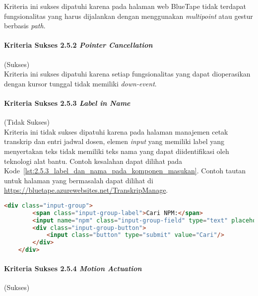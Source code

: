 Kriteria ini sukses dipatuhi karena pada halaman web BlueTape tidak terdapat fungsionalitas yang harus dijalankan dengan menggunakan \textit{multipoint} atau gestur berbasis \textit{path}.

\paragraph{Kriteria Sukses 2.5.2 \textit{Pointer Cancellation}}
\label{par:kepatuhan_bluetape_kriteria_sukses_2.5.2}
(Sukses)\\

Kriteria ini sukses dipatuhi karena setiap fungsionalitas yang dapat dioperasikan dengan kursor tunggal tidak memiliki \textit{down-event}.

\paragraph{Kriteria Sukses 2.5.3 \textit{Label in Name}}
\label{par:kepatuhan_bluetape_kriteria_sukses_2.5.3}
(Tidak Sukses)\\

Kriteria ini tidak sukses dipatuhi karena pada halaman manajemen cetak transkrip dan entri jadwal dosen, elemen \textit{input} yang memiliki label yang menyertakan teks tidak memiliki teks nama yang dapat diidentifikasi oleh teknologi alat bantu. Contoh kesalahan dapat dilihat pada \mbox{Kode \ref{lst:2.5.3_label_dan_nama_pada_komponen_masukan}}. Contoh tautan untuk halaman yang bermasalah dapat dilihat di \url{https://bluetape.azurewebsites.net/TranskripManage}.

\begin{lstlisting}[frame=single, label={lst:2.5.3_label_dan_nama_pada_komponen_masukan}, language=HTML, caption=Pelanggaran Kriteria Sukses 2.5.3 pada Halaman Manajemen Cetak Transkrip]
    <div class="input-group">
        <span class="input-group-label">Cari NPM:</span>
        <input name="npm" class="input-group-field" type="text" placeholder="2013730013" maxlength="10" minlength="10"<?= $npmQuery === NULL ? '' : " value='$npmQuery'" ?>/>
        <div class="input-group-button">
            <input class="button" type="submit" value="Cari"/>
        </div>
    </div>
\end{lstlisting}

\paragraph{Kriteria Sukses 2.5.4 \textit{Motion Actuation}}
\label{par:kepatuhan_bluetape_kriteria_sukses_2.5.4}
(Sukses)\\

